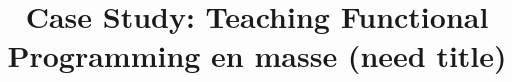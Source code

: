 \documentclass{sig-alternate}
\begin{document}
\setmonofont[Scale=0.8,BoldFont={Consolas Bold}]{Consolas}
%

\title{Case Study: Teaching Functional Programming en masse (need title)}
%
%
%
%
%
\end{document}

